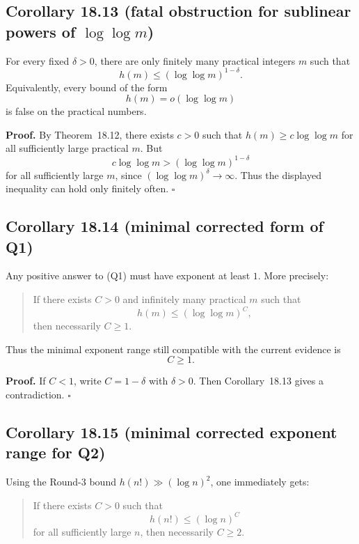 \subsection*{Corollary 18.13 (fatal obstruction for sublinear powers of \(\log\log m\))}

For every fixed \(\delta>0\), there are only finitely many practical integers \(m\) such that
\[
h(m)\le (\log\log m)^{1-\delta}.
\]
Equivalently, every bound of the form
\[
h(m)=o(\log\log m)
\]
is false on the practical numbers.

\medskip

\noindent\textbf{Proof.}
By Theorem~18.12, there exists \(c>0\) such that \(h(m)\ge c\log\log m\) for all sufficiently large practical \(m\). But
\[
c\log\log m > (\log\log m)^{1-\delta}
\]
for all sufficiently large \(m\), since \((\log\log m)^\delta\to\infty\). Thus the displayed inequality can hold only finitely often.
\hfill\(\square\)

\subsection*{Corollary 18.14 (minimal corrected form of Q1)}

Any positive answer to (Q1) must have exponent at least \(1\). More precisely:

\begin{quote}
If there exists \(C>0\) and infinitely many practical \(m\) such that
\[
h(m)\le (\log\log m)^C,
\]
then necessarily \(C\ge 1\).
\end{quote}

Thus the minimal exponent range still compatible with the current evidence is
\[
C\ge 1.
\]

\medskip

\noindent\textbf{Proof.}
If \(C<1\), write \(C=1-\delta\) with \(\delta>0\). Then Corollary~18.13 gives a contradiction.
\hfill\(\square\)

\subsection*{Corollary 18.15 (minimal corrected exponent range for Q2)}

Using the Round-3 bound \(h(n!)\gg (\log n)^2\), one immediately gets:

\begin{quote}
If there exists \(C>0\) such that
\[
h(n!)\le (\log n)^C
\]
for all sufficiently large \(n\), then necessarily \(C\ge 2\).
\end{quote}

